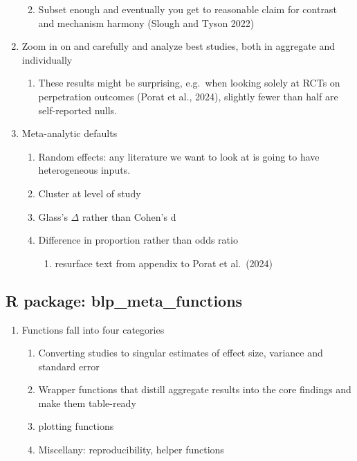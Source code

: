 \documentclass[
  man]{apa6}
\providecommand{\tightlist}{%
  \setlength{\itemsep}{0pt}\setlength{\parskip}{0pt}}
\begin{document}
\begin{enumerate}
  \begin{enumerate}
  \def\labelenumii{\arabic{enumii}.}
  \setcounter{enumii}{3}
  \tightlist
  \item
    Subset enough and eventually you get to reasonable claim for contrast and mechanism harmony (Slough and Tyson 2022)
  \end{enumerate}
\item
  Zoom in on and carefully and analyze best studies, both in aggregate and individually

  \begin{enumerate}
  \def\labelenumii{\arabic{enumii}.}
  \setcounter{enumii}{4}
  \tightlist
  \item
    These results might be surprising, e.g.~when looking solely at RCTs on perpetration outcomes (Porat et al., 2024), slightly fewer than half are self-reported nulls.
  \end{enumerate}
\item
  Meta-analytic defaults

  \begin{enumerate}
  \def\labelenumii{\arabic{enumii}.}
  \setcounter{enumii}{5}
  \tightlist
  \item
    Random effects: any literature we want to look at is going to have heterogeneous inputs.
  \item
    Cluster at level of study
  \item
    Glass's \(\Delta\) rather than Cohen's d
  \item
    Difference in proportion rather than odds ratio

    \begin{enumerate}
    \def\labelenumiii{\arabic{enumiii}.}
    \setcounter{enumiii}{6}
    \tightlist
    \item
      resurface text from appendix to Porat et al.~(2024)
    \end{enumerate}
  \end{enumerate}
\end{enumerate}

\subsection{R package: blp\_meta\_functions}\label{r-package-blp_meta_functions}

\begin{enumerate}
\def\labelenumi{\arabic{enumi}.}
\tightlist
\item
  Functions fall into four categories

  \begin{enumerate}
  \def\labelenumii{\arabic{enumii}.}
  \tightlist
  \item
    Converting studies to singular estimates of effect size, variance and standard error
  \item
    Wrapper functions that distill aggregate results into the core findings and make them table-ready
  \item
    plotting functions
  \item
    Miscellany: reproducibility, helper functions
  \end{enumerate}
\end{enumerate}
\end{document}
